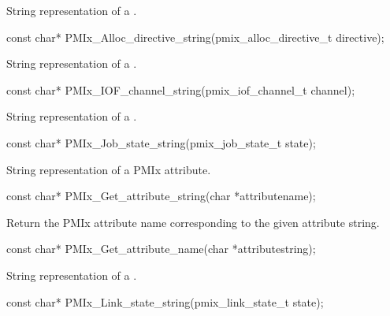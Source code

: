 \summary
{}

String representation of a .

\cspecificstart
\begin{codepar}
const char*
PMIx_Alloc_directive_string(pmix_alloc_directive_t directive);
\end{codepar}
\cspecificend

\summary
{}

String representation of a .

\cspecificstart
\begin{codepar}
const char*
PMIx_IOF_channel_string(pmix_iof_channel_t channel);
\end{codepar}
\cspecificend

\summary
{}

String representation of a .

\cspecificstart
\begin{codepar}
const char*
PMIx_Job_state_string(pmix_job_state_t state);
\end{codepar}
\cspecificend

\summary
{}

String representation of a \ac{PMIx} attribute.

\cspecificstart
\begin{codepar}
const char*
PMIx_Get_attribute_string(char *attributename);
\end{codepar}
\cspecificend

\summary
{}

Return the \ac{PMIx} attribute name corresponding to the given attribute string.

\cspecificstart
\begin{codepar}
const char*
PMIx_Get_attribute_name(char *attributestring);
\end{codepar}
\cspecificend

\summary
{}

String representation of a .

\cspecificstart
\begin{codepar}
const char*
PMIx_Link_state_string(pmix_link_state_t state);
\end{codepar}
\cspecificend


